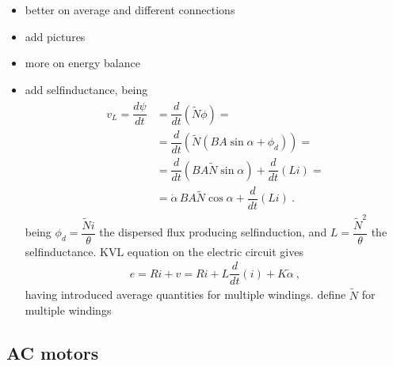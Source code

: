 \documentclass[letterpaper,10pt,english]{jupyterBook}
\begin{document}
\sphinxAtStartPar
{}
\begin{itemize}
\item {} 
\sphinxAtStartPar
better on average and different connections

\item {} 
\sphinxAtStartPar
add pictures

\item {} 
\sphinxAtStartPar
more on energy balance

\item {} 
\sphinxAtStartPar
add self\sphinxhyphen{}inductance, being
\begin{equation*}
\begin{split}\begin{aligned}
     v_L = \dfrac{d \psi}{d t}
     & = \dfrac{d}{d t}\left( \widetilde{N} \phi \right) = \\
     & = \dfrac{d}{d t} \left( \widetilde{N} \left( B A \sin \alpha + \phi_d \right) \right) = \\
     & = \dfrac{d}{d t} \left( B A \widetilde{N} \sin \alpha \right) + \dfrac{d}{dt} \left( L i \right)  = \\
     & = \dot{\alpha} \, B A \widetilde{N} \cos \alpha + \dfrac{d}{dt} \left( L i \right) \ .
   \end{aligned}\end{split}
\end{equation*}
\sphinxAtStartPar
being \(\phi_d = \dfrac{\widetilde{N} i}{\theta}\) the dispersed flux producing self\sphinxhyphen{}induction, and \(L = \dfrac{\widetilde{N}^2}{\theta}\) the self\sphinxhyphen{}inductance. KVL equation on the electric circuit gives
\begin{equation*}
\begin{split}e = R i + v = R i + L \dfrac{d}{dt} (i ) + K \dot{\alpha} \ ,\end{split}
\end{equation*}
\sphinxAtStartPar
having introduced average quantities for multiple windings.  define \(\widetilde{N}\) for multiple windings

\end{itemize}

\sphinxstepscope


\subsection{AC motors}
\label{\detokenize{ch/systems-electromechanic-motor-ac:ac-motors}}\label{\detokenize{ch/systems-electromechanic-motor-ac:classical-electromagnetism-systems-electromechanic-examples-ac-motor}}\label{\detokenize{ch/systems-electromechanic-motor-ac::doc}}
\sphinxstepscope
\end{document}
